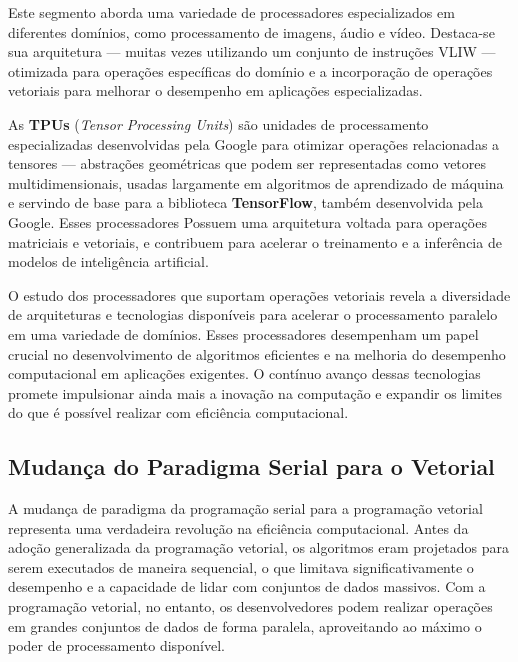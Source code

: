 \documentclass[12pt, %
openright, 
oneside, %
a4paper,    %
brazil]{facom-ufu-abntex2}
\begin{document}
Este segmento aborda uma variedade de processadores especializados em diferentes domínios, como processamento de imagens, áudio e vídeo. Destaca-se sua arquitetura --- muitas vezes utilizando um conjunto de instruções VLIW --- otimizada para operações específicas do domínio e a incorporação de operações vetoriais para melhorar o desempenho em aplicações especializadas.


As \textbf{TPUs} (\textit{Tensor Processing Units}) são unidades de processamento especializadas desenvolvidas pela Google para otimizar operações relacionadas a tensores --- abstrações geométricas que podem ser representadas como vetores multidimensionais, usadas largamente em algoritmos de aprendizado de máquina e servindo de base para a biblioteca \textbf{TensorFlow}, também desenvolvida pela Google. Esses processadores Possuem uma arquitetura voltada para operações matriciais e vetoriais, e contribuem para acelerar o treinamento e a inferência de modelos de inteligência artificial.

O estudo dos processadores que suportam operações vetoriais revela a diversidade de arquiteturas e tecnologias disponíveis para acelerar o processamento paralelo em uma variedade de domínios. Esses processadores desempenham um papel crucial no desenvolvimento de algoritmos eficientes e na melhoria do desempenho computacional em aplicações exigentes. O contínuo avanço dessas tecnologias promete impulsionar ainda mais a inovação na computação e expandir os limites do que é possível realizar com eficiência computacional.




\subsection{Mudança do Paradigma Serial para o Vetorial}

A mudança de paradigma da programação serial para a programação vetorial representa uma verdadeira revolução na eficiência computacional. Antes da adoção generalizada da programação vetorial, os algoritmos eram projetados para serem executados de maneira sequencial, o que limitava significativamente o desempenho e a capacidade de lidar com conjuntos de dados massivos. Com a programação vetorial, no entanto, os desenvolvedores podem realizar operações em grandes conjuntos de dados de forma paralela, aproveitando ao máximo o poder de processamento disponível.
\end{document}
